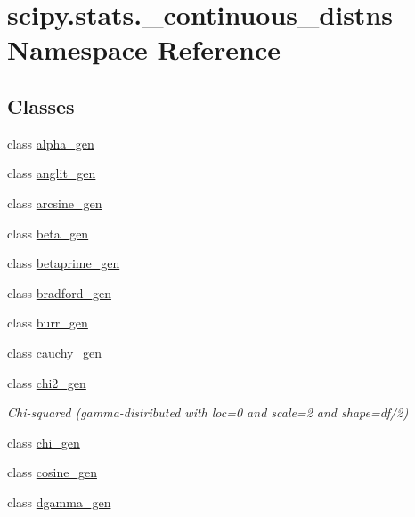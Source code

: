 \hypertarget{namespacescipy_1_1stats_1_1__continuous__distns}{}\section{scipy.\+stats.\+\_\+continuous\+\_\+distns Namespace Reference}
\label{namespacescipy_1_1stats_1_1__continuous__distns}
\subsection*{Classes}
\begin{DoxyCompactItemize}
\item 
class \hyperlink{classscipy_1_1stats_1_1__continuous__distns_1_1alpha__gen}{alpha\+\_\+gen}
\item 
class \hyperlink{classscipy_1_1stats_1_1__continuous__distns_1_1anglit__gen}{anglit\+\_\+gen}
\item 
class \hyperlink{classscipy_1_1stats_1_1__continuous__distns_1_1arcsine__gen}{arcsine\+\_\+gen}
\item 
class \hyperlink{classscipy_1_1stats_1_1__continuous__distns_1_1beta__gen}{beta\+\_\+gen}
\item 
class \hyperlink{classscipy_1_1stats_1_1__continuous__distns_1_1betaprime__gen}{betaprime\+\_\+gen}
\item 
class \hyperlink{classscipy_1_1stats_1_1__continuous__distns_1_1bradford__gen}{bradford\+\_\+gen}
\item 
class \hyperlink{classscipy_1_1stats_1_1__continuous__distns_1_1burr__gen}{burr\+\_\+gen}
\item 
class \hyperlink{classscipy_1_1stats_1_1__continuous__distns_1_1cauchy__gen}{cauchy\+\_\+gen}
\item 
class \hyperlink{classscipy_1_1stats_1_1__continuous__distns_1_1chi2__gen}{chi2\+\_\+gen}
\begin{DoxyCompactList}\small\item\em Chi-\/squared (gamma-\/distributed with loc=0 and scale=2 and shape=df/2) \end{DoxyCompactList}\item 
class \hyperlink{classscipy_1_1stats_1_1__continuous__distns_1_1chi__gen}{chi\+\_\+gen}
\item 
class \hyperlink{classscipy_1_1stats_1_1__continuous__distns_1_1cosine__gen}{cosine\+\_\+gen}
\item 
class \hyperlink{classscipy_1_1stats_1_1__continuous__distns_1_1dgamma__gen}{dgamma\+\_\+gen}

\end{DoxyCompactItemize}
